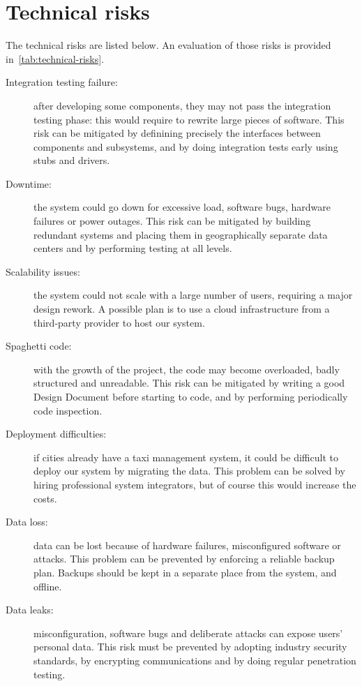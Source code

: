 \section{Technical risks}

The technical risks are listed below. An evaluation of those risks is provided in~\autoref{tab:technical-risks}.

\begin{description}

    \item[Integration testing failure:] after developing some components, they may not pass the integration testing phase: this would require to rewrite large pieces of software. This risk can be mitigated by definining precisely the interfaces between components and subsystems, and by doing integration tests early using stubs and drivers.

    \item[Downtime:] the system could go down for excessive load, software bugs, hardware failures or power outages. This risk can be mitigated by building redundant systems and placing them in geographically separate data centers and by performing testing at all levels.

    \item[Scalability issues:] the system could not scale with a large number of users, requiring a major design rework. A possible plan is to use a cloud infrastructure from a third-party provider to host our system.

    \item[Spaghetti code:] with the growth of the project, the code may become overloaded, badly structured and unreadable. This risk can be mitigated by writing a good Design Document before starting to code, and by performing periodically code inspection.

    \item[Deployment difficulties:] if cities already have a taxi management system, it could be difficult to deploy our system by migrating the data. This problem can be solved by hiring professional system integrators, but of course this would increase the costs.

    \item[Data loss:] data can be lost because of hardware failures, misconfigured software or attacks. This problem can be prevented by enforcing a reliable backup plan. Backups should be kept in a separate place from the system, and offline.

    \item[Data leaks:] misconfiguration, software bugs and deliberate attacks can expose users' personal data. This risk must be prevented by adopting industry security standards, by encrypting communications and by doing regular penetration testing.

\end{description}

